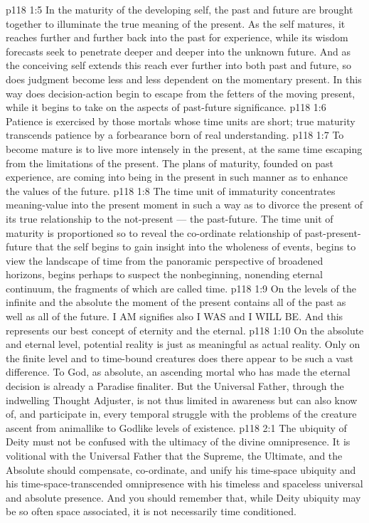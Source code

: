 \vs p118 1:5 In the maturity of the developing self, the past and future are brought together to illuminate the true meaning of the present. As the self matures, it reaches further and further back into the past for experience, while its wisdom forecasts seek to penetrate deeper and deeper into the unknown future. And as the conceiving self extends this reach ever further into both past and future, so does judgment become less and less dependent on the momentary present. In this way does decision\hyp{}action begin to escape from the fetters of the moving present, while it begins to take on the aspects of past\hyp{}future significance.
\vs p118 1:6 \pc Patience is exercised by those mortals whose time units are short; true maturity transcends patience by a forbearance born of real understanding.
\vs p118 1:7 \pc To become mature is to live more intensely in the present, at the same time escaping from the limitations of the present. The plans of maturity, founded on past experience, are coming into being in the present in such manner as to enhance the values of the future.
\vs p118 1:8 The time unit of immaturity concentrates meaning\hyp{}value into the present moment in such a way as to divorce the present of its true relationship to the not\hyp{}present --- the past\hyp{}future. The time unit of maturity is proportioned so to reveal the co\hyp{}ordinate relationship of past\hyp{}present\hyp{}future that the self begins to gain insight into the wholeness of events, begins to view the landscape of time from the panoramic perspective of broadened horizons, begins perhaps to suspect the nonbeginning, nonending eternal continuum, the fragments of which are called time.
\vs p118 1:9 On the levels of the infinite and the absolute the moment of the present contains all of the past as well as all of the future. I AM signifies also I WAS and I WILL BE. And this represents our best concept of eternity and the eternal.
\vs p118 1:10 On the absolute and eternal level, potential reality is just as meaningful as actual reality. Only on the finite level and to time\hyp{}bound creatures does there appear to be such a vast difference. To God, as absolute, an ascending mortal who has made the eternal decision is already a Paradise finaliter. But the Universal Father, through the indwelling Thought Adjuster, is not thus limited in awareness but can also know of, and participate in, every temporal struggle with the problems of the creature ascent from animallike to Godlike levels of existence.
\vs p118 2:1 The ubiquity of Deity must not be confused with the ultimacy of the divine omnipresence. It is volitional with the Universal Father that the Supreme, the Ultimate, and the Absolute should compensate, co\hyp{}ordinate, and unify his time\hyp{}space ubiquity and his time\hyp{}space\hyp{}transcended omnipresence with his timeless and spaceless universal and absolute presence. And you should remember that, while Deity ubiquity may be so often space associated, it is not necessarily time conditioned.
